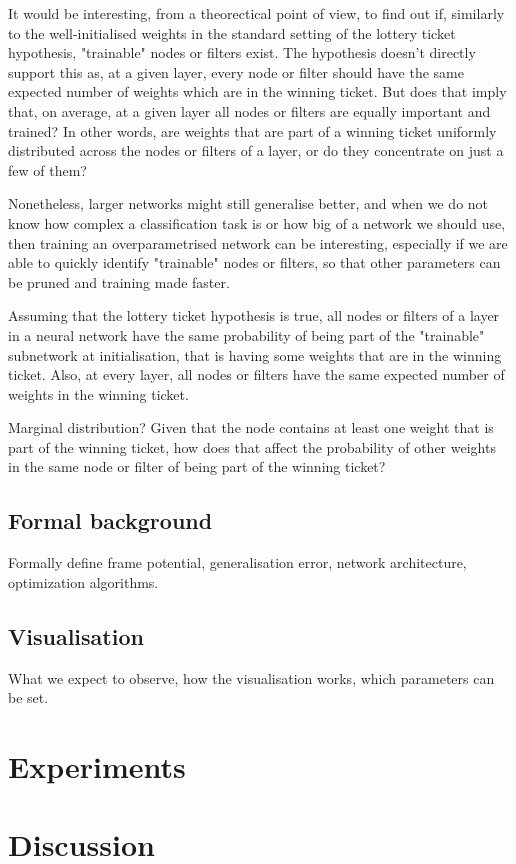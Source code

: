 It would be interesting, from a theorectical point of view, to find out if, similarly to the well-initialised weights in the standard setting of the lottery ticket hypothesis, "trainable" nodes or filters exist. The hypothesis doesn't directly support this as, at a given layer, every node or filter should have the same expected number of weights which are in the winning ticket. But does that imply that, on average, at a given layer all nodes or filters are equally important and trained? In other words, are weights that are part of a winning ticket uniformly distributed across the nodes or filters of a layer, or do they concentrate on just a few of them?

Nonetheless, larger networks might still generalise better, and when we do not know how complex a classification task is or how big of a network we should use, then training an overparametrised network can be interesting, especially if we are able to quickly identify "trainable" nodes or filters, so that other parameters can be pruned and training made faster. 

Assuming that the lottery ticket hypothesis is true, all nodes or filters of a layer in a neural network have the same probability of being part of the "trainable" subnetwork at initialisation, that is having some weights that are in the winning ticket. Also, at every layer, all nodes or filters have the same expected number of weights in the winning ticket. 

Marginal distribution? Given that the node contains at least one weight that is part of the winning ticket, how does that affect the probability of other weights in the same node or filter of being part of the winning ticket?

\subsection{Formal background}

Formally define frame potential, generalisation error, network architecture, optimization algorithms. 

\subsection{Visualisation}
What we expect to observe, how the visualisation works, which parameters can be set.

\section{Experiments}

\section{Discussion}


\nocite{*}
\printbibliography


